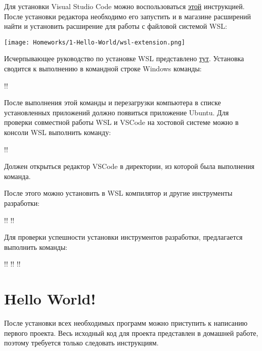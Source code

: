 \documentclass[14pt]{extarticle}
\begin{document}
Для установки Visual Studio Code можно воспользоваться
\href{https://code.visualstudio.com/docs/setup/windows#_installation}{этой}
инструкцией.
После установки редактора необходимо его запустить и в магазине расширений найти и установить
расширение для работы с файловой системой WSL:

\begin{center}
    \texttt{[image: Homeworks/1-Hello-World/wsl-extension.png]}
\end{center}

Исчерпывающее руководство по установке WSL представлено
\href{https://learn.microsoft.com/ru-ru/windows/wsl/setup/environment}{тут}.
Установка сводится к выполнению в командной строке Windows команды:

\begin{terminalwindow}
!!
\end{terminalwindow}

После выполнения этой команды и перезагрузки компьютера в списке установленных приложений
должно появиться приложение Ubuntu.
Для проверки совместной работы WSL и VSCode на хостовой системе можно в консоли WSL выполнить
команду:

\begin{terminalwindow}
!!
\end{terminalwindow}

Должен открыться редактор VSCode в директории, из которой была выполнения команда.

После этого можно установить в WSL компилятор и другие инструменты разработки:

\begin{terminalwindow}
!!
!!
\end{terminalwindow}

Для проверки успешности установки инструментов разработки, предлагается выполнить команды:

\begin{terminalwindow}
!!
!!
!!
\end{terminalwindow}

\section{Hello World!}

После установки всех необходимых программ можно приступить к написанию первого проекта.
Весь исходный код для проекта представлен в домашней работе, поэтому требуется только следовать
инструкциям.
\end{document}
